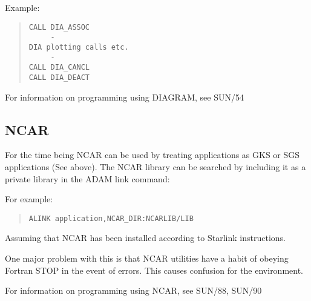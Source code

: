 Example:
\begin{quote} \begin{verbatim}
CALL DIA_ASSOC
     -
DIA plotting calls etc.
     -
CALL DIA_CANCL
CALL DIA_DEACT

\end{verbatim} \end{quote}
For information on programming using DIAGRAM, see SUN/54

\subsection{NCAR}
For the time being
NCAR can be used by treating applications as GKS or SGS applications
(See above). The NCAR library can be searched by including it as a private
library in the ADAM link command:

For example:
\begin{quote} \begin{verbatim}
ALINK application,NCAR_DIR:NCARLIB/LIB
\end{verbatim} \end{quote}
Assuming that NCAR has been installed according to Starlink instructions.

One major problem with this is that NCAR utilities have a habit of obeying
Fortran STOP in the event of errors. This causes confusion for the environment.

For information on programming using NCAR, see SUN/88, SUN/90


